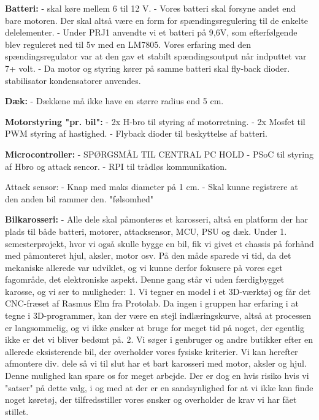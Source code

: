 \textbf{Batteri:}
- skal køre mellem 6 til 12 V.
- Vores batteri skal forsyne andet end bare motoren. Der skal altså være en form for spændingsregulering til de enkelte delelementer.
- Under PRJ1 anvendte vi et batteri på 9,6V, som efterfølgende blev reguleret ned til 5v med en LM7805. Vores erfaring med den spændingsregulator var at den gav et stabilt spændingsoutput når indputtet var 7+ volt.
- Da motor og styring kører på samme batteri skal fly-back dioder. stabilisator kondensatorer anvendes. 

\textbf{Dæk:}
- Dækkene må ikke have en større radius end 5 cm.

\textbf{Motorstyring "pr. bil":}
- 2x H-bro til styring af motorretning.
- 2x Mosfet til PWM styring af hastighed.
- Flyback dioder til beskyttelse af batteri.


\textbf{Microcontroller:} - SPØRGSMÅL TIL CENTRAL PC HOLD
- PSoC til styring af Hbro og attack sencor.
- RPI til trådløs kommunikation.

Attack sensor:
- Knap med maks diameter på 1 cm.
- Skal kunne registrere at den anden bil rammer den. "følsomhed"

\textbf{Bilkarosseri:}
- Alle dele skal påmonteres et karosseri, altså en platform der har plads til både batteri, motorer, attacksensor, MCU, PSU og dæk.
Under 1. semesterprojekt, hvor vi også skulle bygge en bil, fik vi givet et chassis på forhånd med påmonteret hjul, aksler, motor osv. På den måde sparede vi tid, da det mekaniske allerede var udviklet, og vi kunne derfor fokusere på vores eget fagområde, det elektroniske aspekt.
Denne gang står vi uden færdigbygget karosse, og vi ser to muligheder:
1. Vi tegner en model i et 3D-værktøj og får det CNC-fræset af Rasmus Elm fra Protolab. Da ingen i gruppen har erfaring i at tegne i 3D-programmer, kan der være en stejl indlæringskurve, altså at processen er langsommelig, og vi ikke ønsker at bruge for meget tid på noget, der egentlig ikke er det vi bliver bedømt på.
2. Vi søger i genbruger og andre butikker efter en allerede eksisterende bil, der overholder vores fysiske kriterier. Vi kan herefter afmontere div. dele så vi til slut har et bart karosseri med motor, aksler og hjul.
Denne mulighed kan spare os for meget arbejde. Der er dog en hvis risiko hvis vi "satser" på dette valg, i og med at der er en sandsynlighed for at vi ikke kan finde noget køretøj, der tilfredsstiller vores ønsker og overholder de krav vi har fået stillet.
